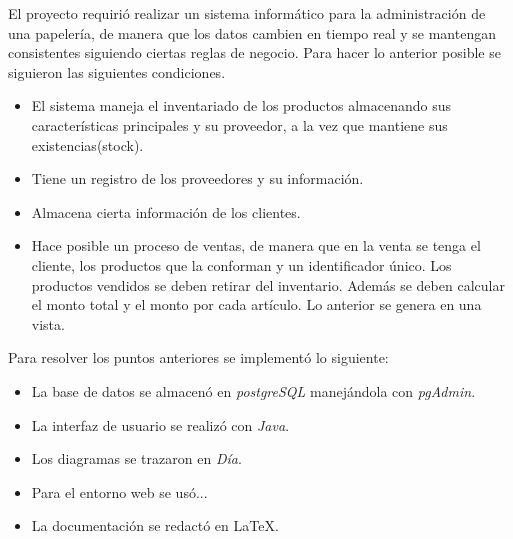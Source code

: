 \documentclass[10pt]{article}
\begin{document}
El proyecto requirió realizar un sistema informático para la administración de una papelería, de manera que los datos cambien en tiempo real y se mantengan consistentes siguiendo ciertas reglas de negocio. Para hacer lo anterior posible se siguieron las siguientes condiciones.

\begin{itemize}
\item El sistema maneja el inventariado de los productos almacenando sus características   	principales y su proveedor, a la vez que mantiene sus existencias(stock).
\item Tiene un registro de los proveedores y su información.
\item Almacena cierta información de los clientes.
\item Hace posible un proceso de ventas, de manera que en la venta se tenga el cliente, los 	  productos que la conforman y un identificador único. Los productos vendidos se deben retirar del inventario. Además se deben calcular el monto total y el monto por cada artículo. Lo anterior se genera en una vista. 
\end{itemize}

Para resolver los puntos anteriores se implementó lo siguiente:

 \begin{itemize}
\item La base de datos se almacenó en \textit{postgreSQL} manejándola con \textit{pgAdmin}.
\item La interfaz de usuario se realizó con \textit{Java}.
\item Los diagramas se trazaron en \textit{Día}.
\item Para el entorno web se usó... 
\item La documentación se redactó en \LaTeX{}.
\end{itemize}
\end{document}

